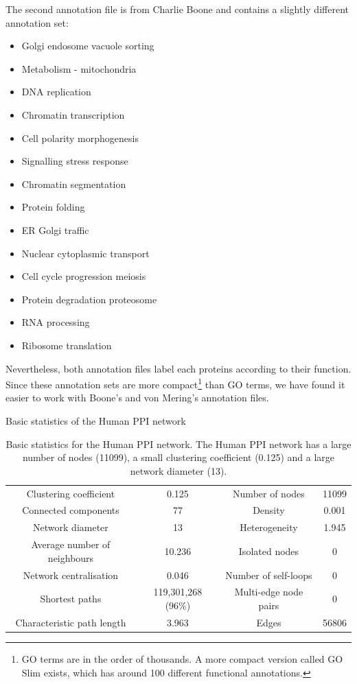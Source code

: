 The second annotation file is from Charlie Boone \cite{costanzo2010genetic} and contains a slightly different annotation set:
\begin{multicols}{2}
\begin{itemize}
  \item Golgi endosome vacuole sorting
  \item Metabolism - mitochondria
  \item DNA replication
  \item Chromatin transcription
  \item Cell polarity morphogenesis
  \item Signalling stress response
  \item Chromatin  segmentation
  \item Protein folding
  \item ER Golgi traffic
  \item Nuclear cytoplasmic transport
  \item Cell cycle progression meiosis
  \item Protein degradation proteosome
  \item RNA processing
  \item Ribosome translation
\end{itemize}
\end{multicols}

Nevertheless, both annotation files label each proteins according to their function. Since these annotation sets are more compact\footnote{GO terms are in the order of thousands. A more compact version called GO Slim exists, which has around 100 different functional annotations.} than GO terms, we have found it easier to work with Boone's and von Mering's annotation files.


\begin{table}
  \centering
  Basic statistics of the Human PPI network\\
  \begin{tabular}{  c  c | c  c }
    Clustering coefficient & 0.125 & Number of nodes & 11099\\
    Connected components & 77 & Density & 0.001\\
    Network diameter & 13 & Heterogeneity & 1.945\\
    Average number of neighbours & 10.236 & Isolated nodes & 0\\
    Network centralisation & 0.046 & Number of self-loops & 0\\
    Shortest paths & 119,301,268 (96\%) & Multi-edge node pairs & 0\\
    Characteristic path length & 3.963 & Edges & 56806\\
  \end{tabular}
  \caption{Basic statistics for the Human PPI network. The Human PPI network has a large number of nodes (11099), a small clustering coefficient (0.125) and a large network diameter (13).}
  \label{tab:ppi_stats_table}
\end{table}

